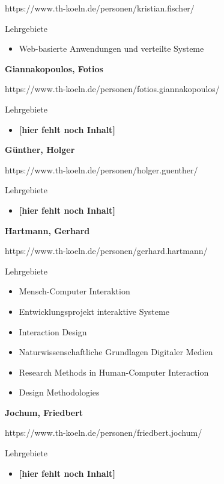 https://www.th-koeln.de/personen/kristian.fischer/

Lehrgebiete

\begin{itemize}
\tightlist
\item
  Web-basierte Anwendungen und verteilte Systeme
\end{itemize}

\textbf{Giannakopoulos, Fotios}

https://www.th-koeln.de/personen/fotios.giannakopoulos/

Lehrgebiete

\begin{itemize}
\tightlist
\item
  \textbf{{[}hier fehlt noch Inhalt{]}}
\end{itemize}

\textbf{Günther, Holger}

https://www.th-koeln.de/personen/holger.guenther/

Lehrgebiete

\begin{itemize}
\tightlist
\item
  \textbf{{[}hier fehlt noch Inhalt{]}}
\end{itemize}

\textbf{Hartmann, Gerhard}

https://www.th-koeln.de/personen/gerhard.hartmann/

Lehrgebiete

\begin{itemize}
\tightlist
\item
  Mensch-Computer Interaktion
\item
  Entwicklungsprojekt interaktive Systeme
\item
  Interaction Design
\item
  Naturwissenschaftliche Grundlagen Digitaler Medien
\item
  Research Methods in Human-Computer Interaction
\item
  Design Methodologies
\end{itemize}

\textbf{Jochum, Friedbert}

https://www.th-koeln.de/personen/friedbert.jochum/

Lehrgebiete

\begin{itemize}
\tightlist
\item
  \textbf{{[}hier fehlt noch Inhalt{]}}
\end{itemize}

